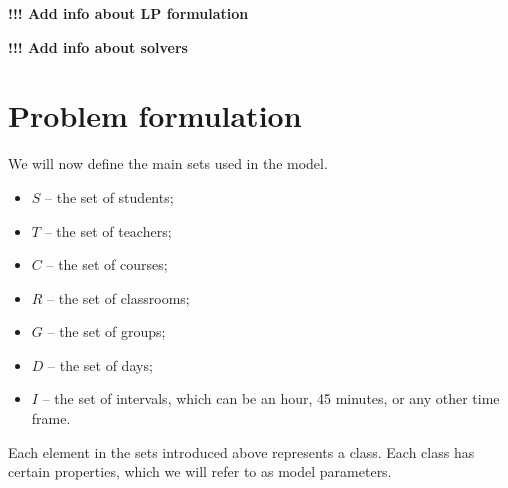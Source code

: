 \documentclass{article}
\begin{document}
\textbf{!!! Add info about LP formulation}

\textbf{!!! Add info about solvers}

\section{Problem formulation}

We will now define the main sets used in the model.

\begin{itemize}
  \setlength\itemsep{0.05em}
    \item $S$ -- the set of students;
    \item $T$ -- the set of teachers;
    \item $C$ -- the set of courses;
    \item $R$ -- the set of classrooms;
    \item $G$ -- the set of groups;
    \item $D$ -- the set of days;
    \item $I$ -- the set of intervals, which can be an hour, 45 minutes, or any other time frame.
\end{itemize}

Each element in the sets introduced above represents a class. Each class has certain properties, which we will refer to as model parameters.
\end{document}
